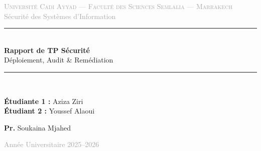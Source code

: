 ﻿\documentclass[12pt,a4paper]{report}
\begin{document}
\begin{titlepage}
  \centering
  \vspace*{1.5cm}

  {\Large\textcolor{darkgray}{\textsc{Université Cadi Ayyad ---
  Faculté des Sciences Semlalia --- Marrakech}}}\\[0.4cm]
  {\large\textcolor{darkgray}{Sécurité des Systèmes d'Information}}\\[2cm]

  \noindent\rule{\textwidth}{1.5pt}\\[0.4cm]
  {\Huge\bfseries\textcolor{primaryblue}{Rapport de TP Sécurité}}\\[0.3cm]
  {\LARGE\textcolor{secred}{Déploiement, Audit \& Remédiation}}\\[0.4cm]
  \noindent\rule{\textwidth}{1.5pt}\\[2cm]

  \begin{minipage}{0.55\textwidth}
    \centering
    \begin{tcolorbox}[colback=lightgray, colframe=primaryblue, title={\bfseries Réalisé par}]
      \textbf{Étudiante 1 :} \quad Aziza Ziri\\[4pt]
      \textbf{Étudiant 2 :} \quad Youssef Alaoui
    \end{tcolorbox}
  \end{minipage}

  \vspace{1cm}

  \begin{minipage}{0.55\textwidth}
    \centering
    \begin{tcolorbox}[colback=lightgray, colframe=darkgray, title={\bfseries Encadrant}]
      \textbf{Pr.} Soukaina Mjahed
    \end{tcolorbox}
  \end{minipage}

  \vfill
  {\large\textcolor{darkgray}{Année Universitaire 2025--2026}}
\end{titlepage}

\tableofcontents
\newpage

\end{document}
